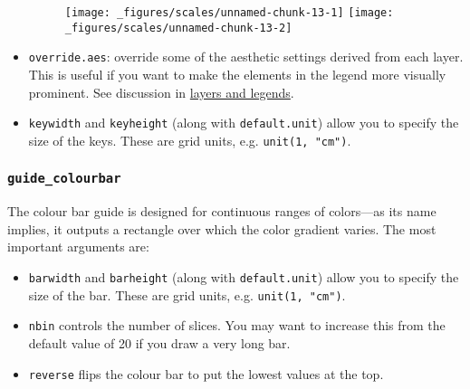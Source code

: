 \begin{itemize}
\begin{Shaded}
\begin{Highlighting}[]
\StringTok{ }\NormalTok{(}\OperatorTok{+}\StringTok{ }\NormalTok{(} \NormalTok{, }\NormalTok{(}
\OperatorTok{+}\StringTok{ }\NormalTok{(} \NormalTok{(} \NormalTok{))}
\end{Highlighting}
\end{Shaded}

  \begin{figure}[H]
    \texttt{[image: \_figures/scales/unnamed-chunk-13-1]}%
    \texttt{[image: \_figures/scales/unnamed-chunk-13-2]}
  \end{figure}
\item
  \texttt{override.aes}: override some of the aesthetic settings derived
  from each layer. This is useful if you want to make the elements in
  the legend more visually prominent. See discussion in
  \protect\hyperlink{sub-layers-legends}{layers and legends}.
\item
  \texttt{keywidth} and \texttt{keyheight} (along with
  \texttt{default.unit}) allow you to specify the size of the keys.
  These are grid units, e.g. \texttt{unit(1,\ "cm")}.
\end{itemize}

\hypertarget{guide_colourbar}{%
\subsubsection{\texorpdfstring{\texttt{guide\_colourbar}}{guide\_colourbar}}\label{guide_colourbar}}

The colour bar guide is designed for continuous ranges of colors---as
its name implies, it outputs a rectangle over which the color gradient
varies. The most important arguments are: 

\begin{itemize}
\item
  \texttt{barwidth} and \texttt{barheight} (along with
  \texttt{default.unit}) allow you to specify the size of the bar. These
  are grid units, e.g. \texttt{unit(1,\ "cm")}.
\item
  \texttt{nbin} controls the number of slices. You may want to increase
  this from the default value of 20 if you draw a very long bar.
\item
  \texttt{reverse} flips the colour bar to put the lowest values at the
  top.
\end{itemize}

